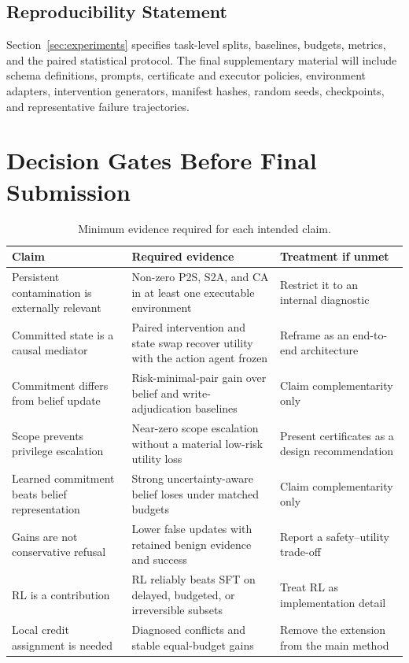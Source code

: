 \documentclass{article}
\begin{document}
\subsection*{Reproducibility Statement}

Section~\ref{sec:experiments} specifies task-level splits, baselines, budgets, metrics, and the paired statistical protocol. The final supplementary material will include schema definitions, prompts, certificate and executor policies, environment adapters, intervention generators, manifest hashes, random seeds, checkpoints, and representative failure trajectories.




\appendix

\section{Decision Gates Before Final Submission}
\label{app:decision-gates}

\begin{table}[h]
\centering
\scriptsize
\caption{Minimum evidence required for each intended claim.}
\label{tab:decision-gates}
\begin{tabularx}{\textwidth}{@{}p{}p{}X@{}}
\toprule
Claim & Required evidence & Treatment if unmet \\
\midrule
Persistent contamination is externally relevant & Non-zero P2S, S2A, and CA in at least one executable environment & Restrict it to an internal diagnostic \\
Committed state is a causal mediator & Paired intervention and state swap recover utility with the action agent frozen & Reframe as an end-to-end architecture \\
Commitment differs from belief update & Risk-minimal-pair gain over belief and write-adjudication baselines & Claim complementarity only \\
Scope prevents privilege escalation & Near-zero scope escalation without a material low-risk utility loss & Present certificates as a design recommendation \\
Learned commitment beats belief representation & Strong uncertainty-aware belief loses under matched budgets & Claim complementarity only \\
Gains are not conservative refusal & Lower false updates with retained benign evidence and success & Report a safety--utility trade-off \\
RL is a contribution & RL reliably beats SFT on delayed, budgeted, or irreversible subsets & Treat RL as implementation detail \\
Local credit assignment is needed & Diagnosed conflicts and stable equal-budget gains & Remove the extension from the main method \\
\bottomrule
\end{tabularx}
\end{table}
\end{document}
